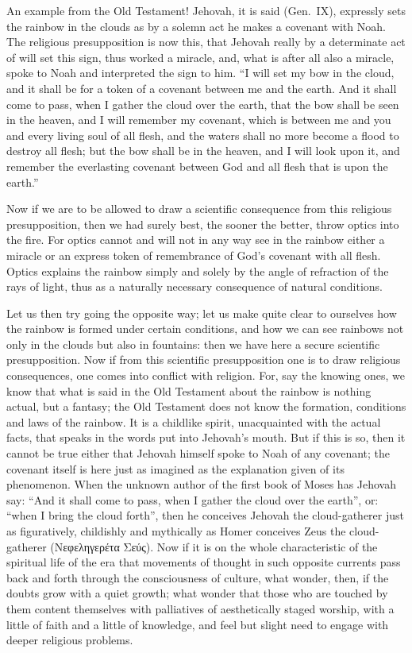 \documentclass[12pt]{book}
\newcommand{\opage}[1]{\marginnote{\footnotesize\textit{[#1]}}}
\begin{document}
An example from the Old Testament! Jehovah, it is said (Gen.\ IX),
expressly sets the rainbow in the clouds as by a solemn act he makes a
covenant with Noah. The religious presupposition is now this, that
Jehovah really by a determinate act of will set this sign, thus worked a
miracle, and, what is after all also a miracle, spoke to Noah and
interpreted the sign to him. ``I will set my bow in the cloud, and it
shall be for a token of a covenant between me and the earth. And it
shall come to pass, when I gather the cloud over the earth, that the bow
shall be seen in the heaven, and I will remember my covenant, which is
between me and you and every living soul of all flesh, and the waters
shall no more become a flood to destroy all flesh; but the bow shall be
in the heaven, and I will look upon it, and remember the everlasting
covenant between God and all flesh that is upon the earth.''

\opage{63}\setcounter{footnote}{0}%
Now if we are to be allowed to draw a scientific consequence from this
religious presupposition, then we had surely best, the sooner the
better, throw optics into the fire. For optics cannot and will not in
any way see in the rainbow either a miracle or an express token of
remembrance of God's covenant with all flesh. Optics explains the
rainbow simply and solely by the angle of refraction of the rays of
light, thus as a naturally necessary consequence of natural conditions.

Let us then try going the opposite way; let us make quite clear to
ourselves how the rainbow is formed under certain conditions, and how we
can see rainbows not only in the clouds but also in fountains: then we
have here a secure scientific presupposition. Now if from this scientific
presupposition one is to draw religious consequences, one comes into
conflict with religion. For, say the knowing ones, we know that what is
said in the Old Testament about the rainbow is nothing actual, but a
fantasy; the Old Testament does not know the formation, conditions and
laws of the rainbow. It is a childlike spirit, unacquainted with the
actual facts, that speaks in the words put into Jehovah's mouth. But if
this is so, then it cannot be true either that Jehovah himself spoke to
Noah of any covenant; the covenant itself is here just as imagined as
the explanation given of its phenomenon. When the unknown author of the
first book of Moses has Jehovah say: ``And it shall come to pass, when I
gather the cloud over the earth'', or: ``when I bring the cloud forth'',
then he conceives Jehovah the cloud-gatherer just as figuratively,
childishly and mythically as Homer conceives Zeus the cloud-gatherer
(Νεφεληγερέτα Σεύς).
Now if it is on the whole characteristic of the spiritual life of the
era that movements of thought in such opposite currents pass back and
forth through the consciousness of culture, what wonder, then, if the
doubts
\opage{64}\setcounter{footnote}{0}%
grow with a quiet growth; what wonder that those who are touched by them
content themselves with palliatives of aesthetically staged worship, with
a little of faith and a little of knowledge, and feel but slight need to
engage with deeper religious problems.
\end{document}
